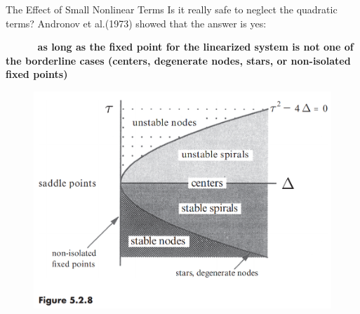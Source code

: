 \documentclass[10pt,aspectratio=43,mathserif,table]{beamer}
\begin{document}
\begin{frame}{The Effect of Small Nonlinear Terms}
    Is it really safe to neglect the quadratic terms?
    \newline 
    \newline 
    Andronov et al.(1973) showed that the answer is yes: 
    
    \textbf{~~~~~ as long as the fixed point for the linearized system is not one of the borderline cases (centers, degenerate nodes, stars, or non-isolated fixed points)}

    \begin{figure}
        \centering
        \includegraphics[width=0.6\linewidth]{f528.jpg}
    \end{figure}
    
\end{frame}
\end{document}
